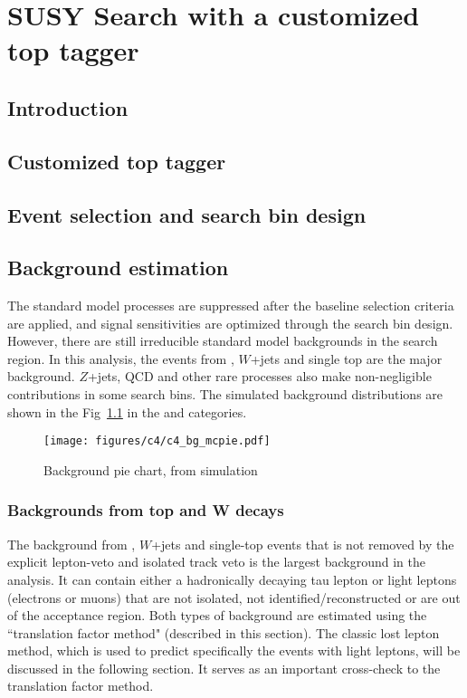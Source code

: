 \chapter{SUSY Search with a customized top tagger}

\clearpage
\section{Introduction}
\label{sec:c4intro}


\clearpage
\section{Customized top tagger}
\label{sec:c4tt}


\clearpage
\section{Event selection and search bin design}
\label{sec:c4evssbd}


\clearpage
\section{Background estimation}

The standard model processes are suppressed after the baseline selection criteria are applied, and signal sensitivities are optimized through the search bin design. However, there are still irreducible standard model backgrounds in the search region. In this analysis, the events from \ttbar, $W$+jets and single top are the major background. $Z$+jets, QCD and other rare processes also make non-negligible contributions in some search bins. The simulated background distributions are shown in the Fig~\ref{fig:c4bgmcpie} in the \ntops and \nbjets categories.

\begin{figure}[htbp]
 \begin{center}
  \texttt{[image: figures/c4/c4\_bg\_mcpie.pdf]}
 \end{center}
 \caption{Background pie chart, from simulation}
 \label{fig:c4bgmcpie}
\end{figure}

\clearpage
\subsection{Backgrounds from top and W decays}
The background from \ttbar, $W$+jets and single-top events that is not removed by the explicit lepton-veto and isolated track veto is the largest background in the analysis. It can contain either a hadronically decaying tau lepton or light leptons (electrons or muons) that are not isolated, not identified/reconstructed or are out of the acceptance region. Both types of background are estimated using the ``translation factor method" (described in this section). The classic lost lepton method, which is used to predict specifically the events with light leptons, will be discussed in the following section. It serves as an important cross-check to the translation factor method.

